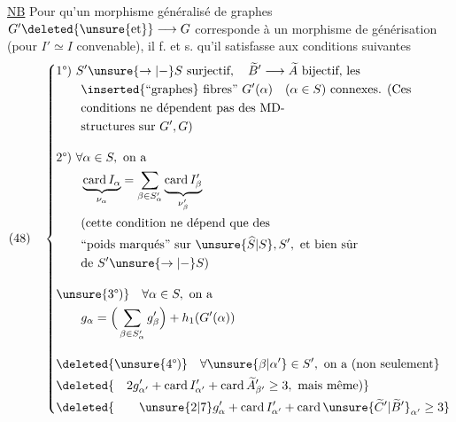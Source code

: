\uline{NB} Pour qu'un morphisme généralisé de graphes $G'\deleted{\unsure{\text{et}}}\longrightarrow G$ corresponde à un morphisme de générisation (pour $I'\simeq I$ convenable), il f. et s. qu'il satisfasse aux conditions suivantes
\[
(48)\quad\left\{\begin{aligned}
&\text{1°) }S'\unsure{\to|{-}}S\text{ surjectif},\quad\widetilde B'\longrightarrow\widetilde A\text{ bijectif, les}\\
&\qquad\inserted{\text{``graphes}}\text{ fibres'' }G'(\alpha)\quad(\alpha\in S)\text{ connexes. (Ces}\\
&\qquad\text{conditions ne dépendent pas des MD-}\\
&\qquad\text{structures sur }G',G\text{)}\\[1em]
&\text{2°) }\forall\alpha\in S,\text{ on a}\\
&\qquad\underbrace{\operatorname{card}I_\alpha}_{\nu_\alpha}=\sum_{\beta\in S'_\alpha}\underbrace{\operatorname{card}I'_\beta}_{\nu'_\beta}\\
&\qquad\text{(cette condition ne dépend que des}\\
&\qquad\text{``poids marqués'' sur }\unsure{\widehat S|S},S',\text{ et bien sûr}\\
&\qquad\text{de }S'\unsure{\to|{-}}S\text{)}\\[1em]
&\unsure{\text{3°)}}\quad\forall\alpha\in S,\text{ on a}\\
&\qquad g_\alpha=\Big(\sum_{\beta\in S'_\alpha}g'_\beta\Big)+h_1(G'(\alpha))\\[1em]
&\deleted{\unsure{\text{4°)}}\quad\forall\unsure{\beta|\alpha'}\in S',\text{ on a (non seulement}}\\
&\deleted{\quad2g'_{\alpha'}+\operatorname{card}I'_{\alpha'}+\operatorname{card}\widetilde A'_{\beta'}\geq3,\text{ mais même)}}\\
&\deleted{\qquad\unsure{2|7}g'_{\alpha}+\operatorname{card}I'_{\alpha'}+\operatorname{card}\unsure{\widetilde C'|\widetilde B'}_{\alpha'}\geq3}
\end{aligned}\right.
\]
